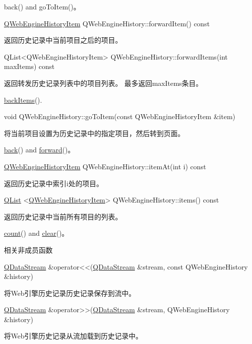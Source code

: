 \begin{notice}[另请参阅]
	back() and goToItem()。
\end{notice}


\href{https://github.com/QtDocumentCN/QtDocumentCN/blob/master/Src/W/QWebEngineHistoryItem/QWebEngineHistoryItem.md}{QWebEngineHistoryItem} QWebEngineHistory::forwardItem() const

返回历史记录中当前项目之后的项目。

QList<QWebEngineHistoryItem> QWebEngineHistory::forwardItems(int maxItems) const

返回转发历史记录列表中的项目列表。 最多返回maxItems条目。

\begin{notice}[另请参阅]
	 \href{https://doc.qt.io/qt-5/qwebenginehistory.html#backItems}{backItems}().
\end{notice}

void QWebEngineHistory::goToItem(const QWebEngineHistoryItem \&item)

将当前项目设置为历史记录中的指定项目，然后转到页面。

\begin{notice}[另请参阅]
 \href{https://doc.qt.io/qt-5/qwebenginehistory.html#back}{back}() and \href{https://doc.qt.io/qt-5/qwebenginehistory.html#forward}{forward}()。
\end{notice}

\href{https://github.com/QtDocumentCN/QtDocumentCN/blob/master/Src/W/QWebEngineHistoryItem/QWebEngineHistoryItem.md}{QWebEngineHistoryItem} QWebEngineHistory::itemAt(int i) const

返回历史记录中索引i处的项目。

\href{https://github.com/QtDocumentCN/QtDocumentCN/blob/master/Src/L/QList/QList.md}{QList} <\href{https://github.com/QtDocumentCN/QtDocumentCN/blob/master/Src/W/QWebEngineHistoryItem/QWebEngineHistoryItem.md}{QWebEngineHistoryItem}> QWebEngineHistory::items() const

返回历史记录中当前所有项目的列表。

\begin{notice}[另请参阅]
 \href{https://doc.qt.io/qt-5/qwebenginehistory.html#count}{count}() and \href{https://doc.qt.io/qt-5/qwebenginehistory.html#clear}{clear}()。

\end{notice}

相关非成员函数

\href{https://github.com/QtDocumentCN/QtDocumentCN/blob/master/Src/D/QDataStream/QDataStream.md}{QDataStream}  \&operator<<(\href{https://github.com/QtDocumentCN/QtDocumentCN/blob/master/Src/D/QDataStream/QDataStream.md}{QDataStream} \&stream, const QWebEngineHistory \&history)


将Web引擎历史记录历史记录保存到流中。

\href{https://github.com/QtDocumentCN/QtDocumentCN/blob/master/Src/D/QDataStream/QDataStream.md}{QDataStream} \&operator>>(\href{https://github.com/QtDocumentCN/QtDocumentCN/blob/master/Src/D/QDataStream/QDataStream.md}{QDataStream} \&stream, QWebEngineHistory \&history)


将Web引擎历史记录从流加载到历史记录中。

